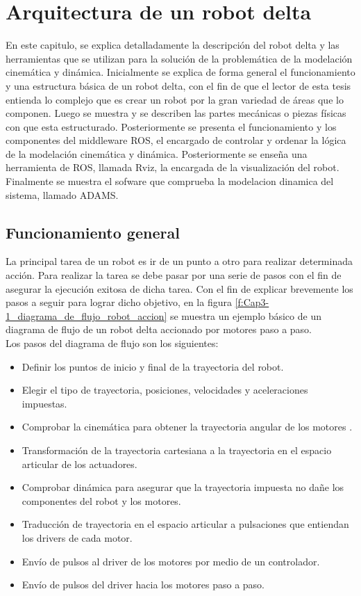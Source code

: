 \chapter{Arquitectura de un robot delta}\label{CAP3}

En este capitulo, se explica detalladamente la descripción del robot delta y las herramientas que se utilizan para la solución de la problemática de la modelación cinemática y dinámica. Inicialmente se explica de forma general el funcionamiento y una estructura básica de un robot delta, con el fin de que el lector de esta tesis entienda lo complejo que es crear un robot por la gran variedad de áreas que lo componen. Luego se muestra y se describen las partes mecánicas o piezas físicas con que esta estructurado. Posteriormente se presenta el funcionamiento y los componentes del middleware ROS, el encargado de controlar y ordenar la lógica de la modelación cinemática y dinámica. Posteriormente se enseña una herramienta de ROS, llamada Rviz, la encargada de la visualización del robot. Finalmente se muestra el sofware que comprueba la modelacion dinamica del sistema, llamado ADAMS.

\section{Funcionamiento general}

La principal tarea de un robot es ir de un punto a otro para realizar determinada acción. Para realizar la tarea se debe pasar por una serie de pasos con el fin de asegurar la ejecución exitosa de dicha tarea. Con el fin de explicar brevemente los pasos a seguir para lograr dicho objetivo, en la figura \eqref{f:Cap3-1_diagrama_de_flujo_robot_accion} se muestra un ejemplo básico de un diagrama de flujo de un robot delta accionado por motores paso a paso.\\

Los pasos del diagrama de flujo son los siguientes:

\begin{itemize}
    \item Definir los puntos de inicio y final de la trayectoria del robot.
    \item Elegir el tipo de trayectoria, posiciones, velocidades y aceleraciones impuestas.
    \item Comprobar la cinemática para obtener la trayectoria angular de los motores .
    \item Transformación de la trayectoria cartesiana a la trayectoria en el espacio articular de los actuadores.    
    \item Comprobar dinámica para asegurar que la trayectoria impuesta no dañe los componentes del robot y los motores.
    \item Traducción de trayectoria en el espacio articular a pulsaciones que entiendan los drivers de cada motor.
    \item Envío de pulsos al driver de los motores por medio de un controlador.
    \item Envío de pulsos del driver hacia los motores paso a paso.
\end{itemize}


